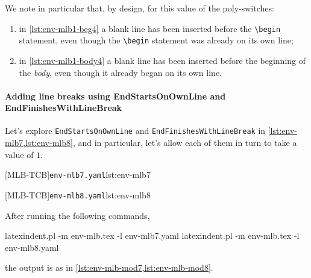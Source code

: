 		\begin{cmhtcbraster}[raster column skip=.1\linewidth]
		\end{cmhtcbraster}

		We note in particular that, by design, for this value of the poly-switches:
		\begin{enumerate}
			\item in \cref{lst:env-mlb1-beg4} a blank line has been inserted before the
			      \lstinline!\begin! statement, even though the \lstinline!\begin!
			      statement was already on its own line;
			\item in \cref{lst:env-mlb1-body4} a blank line has been inserted before the beginning of the
			      \emph{body}, even though it already began on its own line.
		\end{enumerate}

	\paragraph{Adding line breaks using EndStartsOnOwnLine and EndFinishesWithLineBreak}
		Let's explore \texttt{EndStartsOnOwnLine} and \texttt{EndFinishesWithLineBreak} in
		\cref{lst:env-mlb7,lst:env-mlb8}, and in particular, let's allow each of them in turn to
		take a value of $1$.

		\begin{minipage}{.49\textwidth}
			{\texttt{env-mlb7.yaml}}{lst:env-mlb7}
		\end{minipage}
		\hfill
		\begin{minipage}{.49\textwidth}
			{\texttt{env-mlb8.yaml}}{lst:env-mlb8}
		\end{minipage}

		After running the following commands,
		\begin{commandshell}
latexindent.pl -m env-mlb.tex -l env-mlb7.yaml
latexindent.pl -m env-mlb.tex -l env-mlb8.yaml
\end{commandshell}
		the output is as in \cref{lst:env-mlb-mod7,lst:env-mlb-mod8}.

